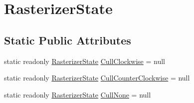 \hypertarget{classMicrosoft_1_1Xna_1_1Framework_1_1Graphics_1_1RasterizerState}{}\section{Rasterizer\+State}
\label{classMicrosoft_1_1Xna_1_1Framework_1_1Graphics_1_1RasterizerState}
\subsection*{Static Public Attributes}
\begin{DoxyCompactItemize}
\item 
static readonly \hyperlink{classMicrosoft_1_1Xna_1_1Framework_1_1Graphics_1_1RasterizerState}{Rasterizer\+State} \hyperlink{classMicrosoft_1_1Xna_1_1Framework_1_1Graphics_1_1RasterizerState_abef271c00fb63c23307e13144e40f563}{Cull\+Clockwise} = null
\item 
static readonly \hyperlink{classMicrosoft_1_1Xna_1_1Framework_1_1Graphics_1_1RasterizerState}{Rasterizer\+State} \hyperlink{classMicrosoft_1_1Xna_1_1Framework_1_1Graphics_1_1RasterizerState_a563fe565033b1047610ba684118d403a}{Cull\+Counter\+Clockwise} = null
\item 
static readonly \hyperlink{classMicrosoft_1_1Xna_1_1Framework_1_1Graphics_1_1RasterizerState}{Rasterizer\+State} \hyperlink{classMicrosoft_1_1Xna_1_1Framework_1_1Graphics_1_1RasterizerState_a4eeaacf9e9f5ba9c73bd0147b9b7a421}{Cull\+None} = null
\end{DoxyCompactItemize}
